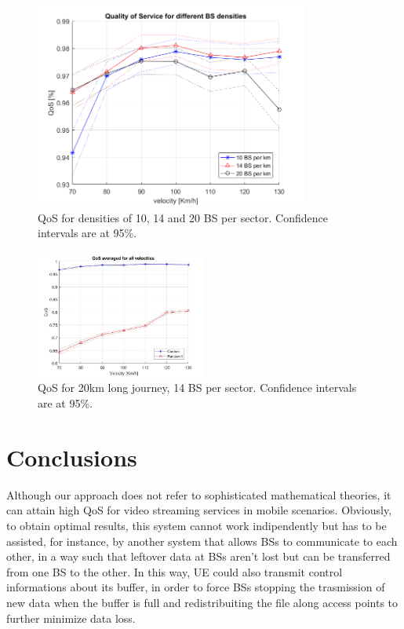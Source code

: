 \documentclass[conference,10pt]{IEEEtran}
\begin{document}
\begin{figure}[t]
	\centering
	\includegraphics[width=9cm]{QoS_10-14-20-BS_densities.png}
	\caption{QoS for densities of 10, 14 and 20 BS per sector. Confidence intervals are at 95\%.}
	\label{fig:QoS_all}
\end{figure}

\begin{figure}[t]
	\centering
	\includegraphics[width=0.5\textwidth]{QoS_20km.jpg}
	\caption{QoS for 20km long journey, 14 BS per sector. Confidence intervals are at 95\%.}
	\label{fig:QoS_20km}
\end{figure}

\section{Conclusions}\label{sec:conclusion}
Although our approach does not refer to sophisticated mathematical theories, it can attain high QoS for video streaming services in mobile scenarios. Obviously, to obtain optimal results, this system cannot work indipendently but has to be assisted, for instance, by another system that allows BSs to communicate to each other, in a way such that leftover data at BSs aren't lost but can be transferred from one BS to the other. In this way, UE could also transmit control informations about its buffer, in order to force BSs stopping the trasmission of new data when the buffer is full and redistribuiting the file along access points  to further minimize data loss.
\end{document}
